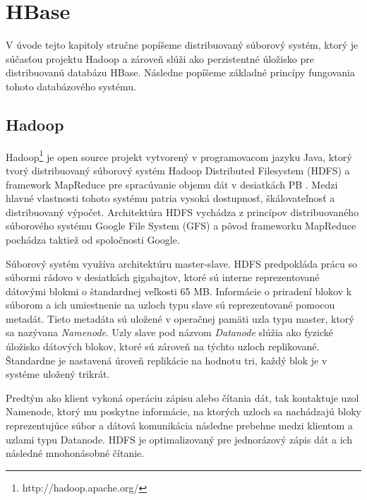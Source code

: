 \documentclass[11pt,twoside,a4paper]{book}
\begin{document}
\chapter{HBase}
V úvode tejto kapitoly stručne popíšeme distribuovaný súborový systém, ktorý je súčasťou projektu Hadoop a zároveň slúži ako perzistentné úložisko pre distribuovanú databázu HBase. Následne popíšeme základné princípy fungovania tohoto databázového systému.

\section*{Hadoop}

Hadoop\footnote{http://hadoop.apache.org/} je open source projekt vytvorený v programovacom jazyku Java, ktorý tvorý distribuovaný súborový systém Hadoop Distributed Filesystem (HDFS) a framework MapReduce pre spracúvanie objemu dát v desiatkách PB \cite{Thusoo:2010:DWA:1807167.1807278}. Medzi hlavné vlastnosti tohoto systému patria vysoká dostupnosť, škálovateľnosť a distribuovaný výpočet. Architektúra HDFS vychádza z princípov distribuovaného súborového systému Google File System (GFS) \cite{Ghemawat:2003:GFS:945445.945450} a pôvod frameworku MapReduce \cite{Dean:2008:MSD:1327452.1327492} pochádza taktiež od spoločnosti Google.

 


Súborový systém využíva architektúru master-slave. HDFS predpokláda prácu so súbormi rádovo v desiatkách gigabajtov, ktoré sú interne reprezentované dátovými blokmi o štandardnej veľkosti 65 MB. Informácie o priradení blokov k súborom a ich umiestnenie na uzloch typu slave sú reprezentované pomocou metadát. Tieto metadáta sú uložené v operačnej pamäti uzla typu master, ktorý sa nazývana \emph{Namenode}. Uzly slave pod názvom \emph{Datanode} slúžia ako fyzické úložisko dátových blokov, ktoré sú zároveň na týchto uzloch replikované. Štandardne je nastavená úroveň replikácie na hodnotu tri,
každý blok je v systéme uložený trikrát.

Predtým ako klient vykoná operáciu zápisu alebo čítania dát, tak kontaktuje uzol Namenode, ktorý mu poskytne informácie, na ktorých uzloch sa nachádzajú bloky reprezentujúce súbor a dátová komunikácia následne prebehne medzi klientom a uzlami typu Datanode. HDFS je optimalizovaný pre jednorázový zápis dát a ich následné mnohonásobné čítanie.
\end{document}

